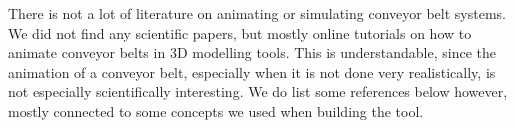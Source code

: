 There is not a lot of literature on animating or simulating conveyor belt systems. We did not find any scientific papers, but mostly online tutorials on how to animate conveyor belts in 3D modelling tools. This is understandable, since the animation of a conveyor belt, especially when it is not done very realistically, is not especially scientifically interesting. We do list some references below however, mostly connected to some concepts we used when building the tool.


\tocsection
